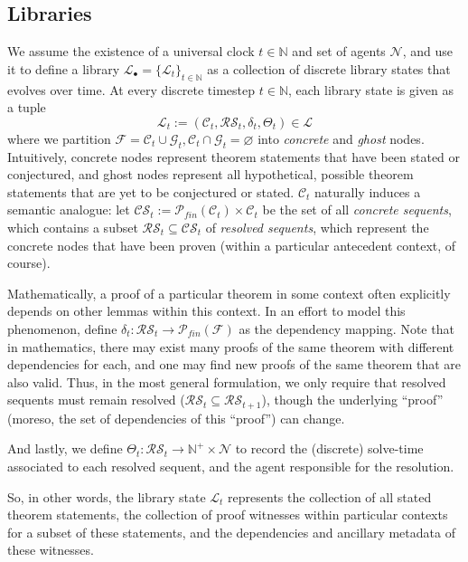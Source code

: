 \subsection{Libraries}

We assume the existence of a universal clock $t \in \mathbb N$ and set of agents $\mathcal N$, and use it to define a library $\mathcal{L}_\bullet = \{\mathcal{L}_t\}_{t \in \mathbb{N}}$ as a collection of discrete library states that evolves over time. At every discrete timestep $t \in \mathbb{N}$, each library state is given as a tuple 
\[\mathcal{L}_t := (\mathcal{C}_t,\mathcal{RS}_t, \delta_t, \Theta_t) \in \mathscr{L}\]
where we partition $\mathcal{F} = \mathcal{C}_t \cup \mathcal{G}_t, \mathcal{C}_t \cap \mathcal{G}_t = \varnothing$ into \textit{concrete} and \textit{ghost} nodes. Intuitively, concrete nodes represent theorem statements that have been stated or conjectured, and ghost nodes represent all hypothetical, possible theorem statements that are yet to be conjectured or stated. $\mathcal{C}_t$ naturally induces a semantic analogue: let $\mathcal{CS}_t := \mathcal{P}_{fin}(\mathcal{C}_t) \times \mathcal{C}_t$ be the set of all \textit{concrete sequents}, which contains a subset $\mathcal{RS}_t \subseteq \mathcal{CS}_t$ of \textit{resolved sequents}, which represent the concrete nodes that have been proven (within a particular antecedent context, of course). 


Mathematically, a proof of a particular theorem in some context often explicitly depends on other lemmas within this context. In an effort to model this phenomenon, define $\delta_t : \mathcal{RS}_t \to \mathcal{P}_{fin}(\mathcal{F})$ as the dependency mapping.
Note that in mathematics, there may exist many proofs of the same theorem with different dependencies for each, and one may find new proofs of the same theorem that are also valid. Thus, in the most general formulation, we only require that resolved sequents must remain resolved ($\mathcal{RS}_{t} \subseteq \mathcal{RS}_{t+1}$), though the underlying ``proof'' (moreso, the set of dependencies of this ``proof'') can change.

And lastly, we define $\Theta_t : \mathcal{RS}_t\to\mathbb N^+ \times \mathcal N$ to record the (discrete) solve-time associated to each resolved sequent, and the agent responsible for the resolution. 


So, in other words, the library state $\mathcal{L}_t$ represents the collection of all stated theorem statements, the collection of proof witnesses within particular contexts for a subset of these statements, and the dependencies and ancillary metadata of these witnesses.

